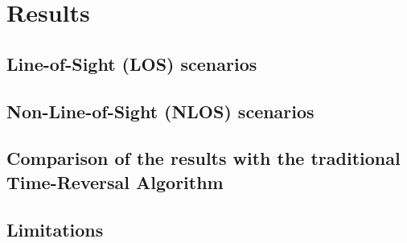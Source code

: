 
\chapter{Results}\label{chapter:results}

\section{Line-of-Sight (LOS) scenarios}

\section{Non-Line-of-Sight (NLOS) scenarios}

\section{Comparison of the results with the traditional Time-Reversal Algorithm}

\section{Limitations}